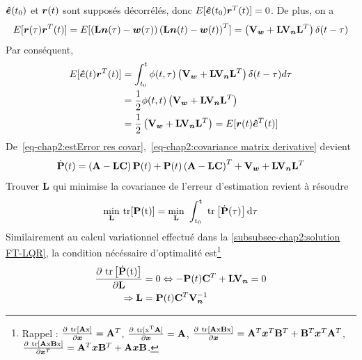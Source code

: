 $\bm{\hat{e}}(t_0)$ et $\bm{r}(t)$ sont supposés décorrélés, donc $E[\bm{\hat{e}}(t_0)\bm{r}^T(t)]=0$. De plus, on a
\begin{equation}
	E[\bm{r}(\tau)\bm{r}^T(t)] = E[\left(\mathbf{L}\bm{n}(\tau)-\bm{w} 	(\tau)\right)\left(\mathbf{L}\bm{n}(t)-\bm{w} 	(t)\right)^T] = \left(\mathbf{V}_{\bm w}+\mathbf{L}\mathbf{V}_{\bm n}\mathbf{L}^T\right)\delta(t-\tau)
\end{equation}
Par conséquent,
\begin{align}\label{eq-chap2:estError res covar}
	\begin{split}
	 E[\bm{\hat{e}}(t)\bm{r}^T(t)] &= \int_{t_0}^{t}\phi(t,\tau)\left(\mathbf{V}_{\bm w}+\mathbf{L}\mathbf{V}_{\bm n}\mathbf{L}^T\right)\delta(t-\tau)d\tau \\ 
	 &=\frac{1}{2}\phi(t,t)\left(\mathbf{V}_{\bm w}+\mathbf{L}\mathbf{V}_{\bm n}\mathbf{L}^T\right)\\
	 &=\frac{1}{2}\left(\mathbf{V}_{\bm w}+\mathbf{L}\mathbf{V}_{\bm n}\mathbf{L}^T\right) = E[\bm{r}(t)\bm{\hat{e}}^T(t)]
	\end{split}
\end{align}
De~\eqref{eq-chap2:estError res covar},~\eqref{eq-chap2:covariance matrix derivative} devient
\begin{equation}\label{eq-chap2:diff riccati eq for observation}
	\dot{\mathbf{P}}(t) = \left(\mathbf{A}-\mathbf{L}\mathbf{C}\right)\mathbf{P}(t) + \mathbf{P}(t)\left(\mathbf{A}-\mathbf{L}\mathbf{C}\right)^T+\mathbf{V}_{\bm w}+\mathbf{L}\mathbf{V}_{\bm n}\mathbf{L}^T
\end{equation}
 Trouver $\mathbf{L}$ qui minimise la covariance de l'erreur d'estimation revient à résoudre 
\begin{equation}
	\underset{\mathbf{L}}{\min}~\rm{tr}[\mathbf{P}(t)] = \underset{\mathbf{L}}{\min}~\int_{t_0}^{t}~\rm{tr}\left[\dot{\mathbf{P}}(\tau)\right]d\tau
\end{equation}
Similairement au calcul variationnel effectué dans la \cref{subsubsec-chap2:solution FT-LQR}, la condition nécéssaire d'optimalité est\footnote{Rappel : $\frac{\partial~\rm{tr}[\mathbf{A} \bm{x}]}{\partial\bm{x}}=\mathbf{A}^T$, $\frac{\partial~\rm{tr}[\bm{x}^T\mathbf{A}]}{\partial\bm{x}}=\mathbf{A}$, $\frac{\partial~\rm{tr}[\mathbf{A}\bm{x}\mathbf{B}\bm{x}]}{\partial\bm{x}}=\mathbf{A}^T\bm{x}^T\mathbf{B}^T+ \mathbf{B}^T\bm{x}^T\mathbf{A}^T$, $\frac{\partial~\rm{tr}[\mathbf{A}\bm{x}\mathbf{B}\bm{x}]}{\partial\bm{x}^T}=\mathbf{A}^T\bm{x}\mathbf{B}^T+ \mathbf{A}\bm{x}\mathbf{B}$.}
\begin{align}\label{eq-chap2:kalman filter gain}
	\begin{split}
		\frac{\partial~\rm{tr}\left[\dot{\mathbf{P}}(t)\right]}{\partial \mathbf{L}}&=0
		\Leftrightarrow -\mathbf{P}(t)\mathbf{C}^T+ \mathbf{L}\mathbf{V}_{\bm n}=0 \\ 
		\Rightarrow\mathbf{L} &= \mathbf{P}(t)\mathbf{C}^T\mathbf{V}_{\bm n}^{-1}
	\end{split}
\end{align}
